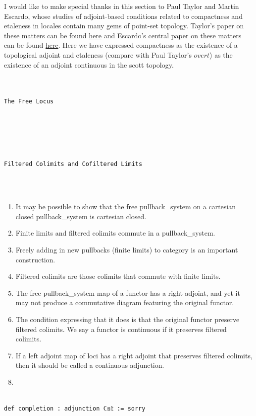 \documentclass{book}
\theoremstyle{definition}
\newcounter{lcounter}
\renewcommand{\chapter}[1]{
\newpage
{
\Huge 
\begin{center}
\ \\
\ \\
\thispagestyle{empty}
\texttt{#1}
\end{center}}
\ \\
\ \\
}
\begin{document}
I would like to make special thanks in this section to Paul Taylor and Martin Escardo, whose studies of adjoint-based conditions related to compactness and etaleness in locales contain many gems of point-set topology. Taylor's paper on these matters can be found \href{https://paultaylor.eu/ASD/foufct/foufct.pdf}{here} and Escardo's central paper on these matters can be found \href{https://www.cs.bham.ac.uk/~mhe/papers/barbados.pdf}{here}. Here we have expressed compactness as the existence of a topological adjoint and etaleness (compare with Paul Taylor's $\textit{overt}$) as the existence of an adjoint continuous in the scott topology. 


\chapter{The Free Locus}

\chapter{Filtered Colimits and Cofiltered Limits}

\begin{enumerate}
\item It may be possible to show that the free pullback_system on a cartesian closed pullback_system is cartesian closed.
\item Finite limits and filtered colimits commute in a pullback\_system.
\item Freely adding in new pullbacks (finite limits) to category is an important construction.
\item Filtered colimits are those colimits that commute with finite limits.
\item The free pullback_system map of a functor has a right adjoint, and yet it may not produce a commutative diagram featuring the original functor. 
\item The condition expressing that it does is that the original functor preserve filtered colimits. We say a functor is continuous if it preserves filtered colimits.
\item If a left adjoint map of loci has a right adjoint that preserves filtered colimits, then it should be called a continuous adjunction.
\item 
\end{enumerate}

\begin{center}
\begin{tcolorbox}[width=5in,colback={white},title={\begin{center}\texttt{Lean \thelcounter} \addtocounter{lcounter}{1}  \end{center}},colbacktitle=Blue,coltitle=black]
\begin{verbatim}

def completion : adjunction ℂ𝕒𝕥 := sorry

\end{verbatim}
\end{tcolorbox}
\end{center}
\end{document}
